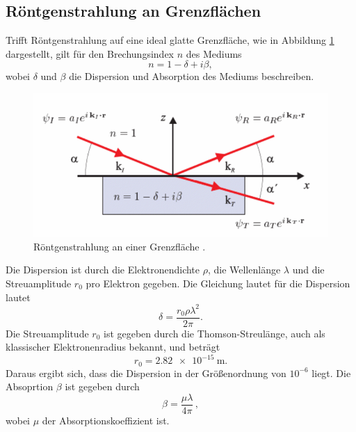 \subsection{Röntgenstrahlung an Grenzflächen} \label{sec:reflektivität}
Trifft Röntgenstrahlung auf eine ideal glatte Grenzfläche, 
wie in Abbildung \ref{fig:reflektivität} dargestellt,
gilt für den Brechungsindex $n$ des Mediums
\begin{equation}
    n = 1 - \delta + i\beta,
\end{equation}
wobei $\delta$ und $\beta$ die Dispersion und Absorption des Mediums beschreiben.
\begin{figure}[H]
    \centering
    \includegraphics[scale=0.5]{Bilder/reflektion.png}
    \caption{Röntgenstrahlung an einer Grenzfläche \cite{als-nielsen2011}.}
    \label{fig:reflektivität}
\end{figure}
Die Dispersion ist durch die Elektronendichte $\rho$, die Wellenlänge $\lambda$ 
und die Streuamplitude $r_0$ pro Elektron gegeben.
Die Gleichung lautet für die Dispersion lautet
\begin{equation}
    \delta = \frac{r_0 \rho \lambda^2}{2\pi} .
    \label{eq:delta}
\end{equation}
Die Streuamplitude $r_0$ ist gegeben durch die Thomson-Streulänge, 
auch als klassischer Elektronenradius bekannt, und beträgt
\begin{equation}
    r_0 = \SI{2.82e-15}{\meter} .
\end{equation}
Daraus ergibt sich, dass die Dispersion in der Größenordnung von $10^{-6}$ liegt.
Die Absoprtion $\beta$ ist gegeben durch
\begin{equation}
    \beta = \frac{\mu \lambda}{4 \pi} \, ,
    \label{eq:beta}
\end{equation}
wobei $\mu$ der Absorptionskoeffizient ist.